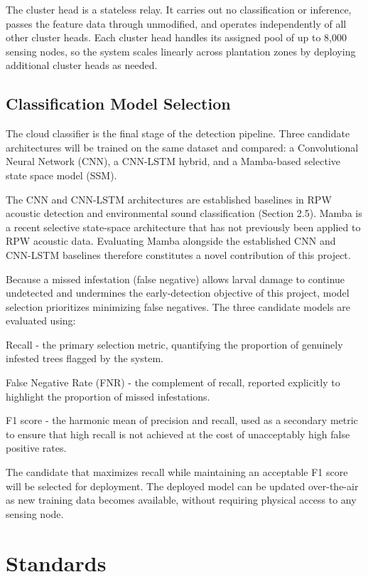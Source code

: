 \documentclass[12pt,a4paper,oneside]{memoir}
\begin{document}
The cluster head is a stateless relay. It carries out no classification or inference, passes the feature data through unmodified, and operates independently of all other cluster heads. Each cluster head handles its assigned pool of up to 8,000 sensing nodes, so the system scales linearly across plantation zones by deploying additional cluster heads as needed.

\subsection{Classification Model Selection}
The cloud classifier is the final stage of the detection pipeline. Three candidate architectures will be trained on the same dataset and compared: a Convolutional Neural Network (CNN), a CNN-LSTM hybrid, and a Mamba-based selective state space model (SSM).

The CNN and CNN-LSTM architectures are established baselines in RPW acoustic detection and environmental sound classification (Section 2.5). Mamba is a recent selective state-space architecture \cite{gu2024mamba} that has not previously been applied to RPW acoustic data. Evaluating Mamba alongside the established CNN and CNN-LSTM baselines therefore constitutes a novel contribution of this project.

Because a missed infestation (false negative) allows larval damage to continue undetected and undermines the early-detection objective of this project, model selection prioritizes minimizing false negatives. The three candidate models are evaluated using:

Recall - the primary selection metric, quantifying the proportion of genuinely infested trees flagged by the system.

False Negative Rate (FNR) - the complement of recall, reported explicitly to highlight the proportion of missed infestations.

F1 score - the harmonic mean of precision and recall, used as a secondary metric to ensure that high recall is not achieved at the cost of unacceptably high false positive rates.

The candidate that maximizes recall while maintaining an acceptable F1 score will be selected for deployment. The deployed model can be updated over-the-air as new training data becomes available, without requiring physical access to any sensing node.

\section{Standards}
\end{document}
